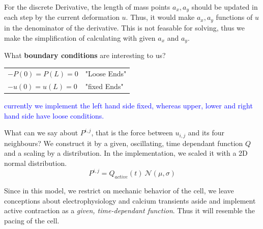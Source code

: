 \theoremstyle{remark}
\newtheorem{anmerkung}{Anmerkung}
\begin{Anmerkung}
	For the discrete Derivative, the length of mass points $a_x, a_y$ should be updated in each step by the current deformation $u$. Thus, it would make $a_x, a_y$ functions of $u$ in the denominator of the derivative. This is not feasable for solving, thus we make the simplification of calculating with given $a_x$ and $a_y$.
\end{Anmerkung}


What \textbf{boundary conditions} are interesting to us?

\noindent
\begin{tabular}{ll}
	$-P(0) = P(L) = 0$ & "Loose Ends" \\
	$-u(0) = u(L) = 0$ & "fixed Ends"
\end{tabular}
\newline 
\textcolor{blue}{currently we implement the left hand side fixed, whereas upper, lower and right hand side have loose conditions.}

What can we say about $P^{i,j}$, that is the force between $u_{i,j}$ and its four neighbours? We construct it by a given, oscillating, time dependant function $Q$ and a scaling by a distribution. In the implementation, we scaled it with a 2D normal distribution.
\begin{equation*}
	P^{i,j} = Q_{active}(t) \ \mathcal{N}(\mu, \sigma)
\end{equation*}


Since in this model, we restrict on mechanic behavior of the cell, we leave conceptions about electrophysiology and calcium transients aside and implement active contraction as a \textit{given, time-dependant function}. Thus it will resemble the pacing of the cell.

\begin{center}
\end{center}



